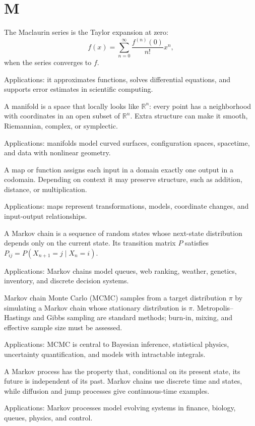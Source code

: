\chapter*{M}
\label{chap:m}

The Maclaurin series is the Taylor expansion at zero:
\[
f(x)=\sum_{n=0}^{\infty}\frac{f^{(n)}(0)}{n!}x^n,
\]
when the series converges to $f$. \par\noindent Applications: it approximates functions, solves differential equations, and supports error estimates in scientific computing.

A manifold is a space that locally looks like $\mathbb R^n$: every point has a neighborhood with coordinates in an open subset of $\mathbb R^n$. Extra structure can make it smooth, Riemannian, complex, or symplectic. \par\noindent Applications: manifolds model curved surfaces, configuration spaces, spacetime, and data with nonlinear geometry.

A map or function assigns each input in a domain exactly one output in a codomain. Depending on context it may preserve structure, such as addition, distance, or multiplication. \par\noindent Applications: maps represent transformations, models, coordinate changes, and input-output relationships.

A Markov chain is a sequence of random states whose next-state distribution depends only on the current state. Its transition matrix $P$ satisfies $P_{ij}=P(X_{n+1}=j\mid X_n=i)$. \par\noindent Applications: Markov chains model queues, web ranking, weather, genetics, inventory, and discrete decision systems.

Markov chain Monte Carlo (MCMC) samples from a target distribution $\pi$ by simulating a Markov chain whose stationary distribution is $\pi$. Metropolis--Hastings and Gibbs sampling are standard methods; burn-in, mixing, and effective sample size must be assessed. \par\noindent Applications: MCMC is central to Bayesian inference, statistical physics, uncertainty quantification, and models with intractable integrals.

A Markov process has the property that, conditional on its present state, its future is independent of its past. Markov chains use discrete time and states, while diffusion and jump processes give continuous-time examples. \par\noindent Applications: Markov processes model evolving systems in finance, biology, queues, physics, and control.

